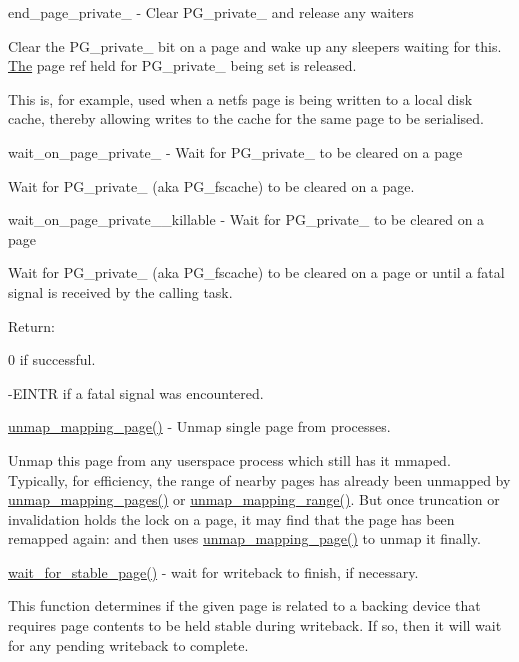 end\+\_\+page\+\_\+private\+\_ -\/ Clear P\+G\+\_\+private\+\_ and release any waiters

Clear the P\+G\+\_\+private\+\_ bit on a page and wake up any sleepers waiting for this. \mbox{\hyperlink{classThe}{The}} page ref held for P\+G\+\_\+private\+\_ being set is released.

This is, for example, used when a netfs page is being written to a local disk cache, thereby allowing writes to the cache for the same page to be serialised.

wait\+\_\+on\+\_\+page\+\_\+private\+\_ -\/ Wait for P\+G\+\_\+private\+\_ to be cleared on a page

Wait for P\+G\+\_\+private\+\_ (aka P\+G\+\_\+fscache) to be cleared on a page.

wait\+\_\+on\+\_\+page\+\_\+private\+\_\+\_\+killable -\/ Wait for P\+G\+\_\+private\+\_ to be cleared on a page

Wait for P\+G\+\_\+private\+\_ (aka P\+G\+\_\+fscache) to be cleared on a page or until a fatal signal is received by the calling task.

Return\+:
\begin{DoxyItemize}
\item 0 if successful.
\item -\/E\+I\+N\+TR if a fatal signal was encountered.
\end{DoxyItemize}

\mbox{\hyperlink{mm_2memory_8c_a4d439e775b6cc8d8d9b4850f51e6e563}{unmap\+\_\+mapping\+\_\+page()}} -\/ Unmap single page from processes.

Unmap this page from any userspace process which still has it mmaped. Typically, for efficiency, the range of nearby pages has already been unmapped by \mbox{\hyperlink{mm_2memory_8c_afb3cdfd244b83569cc07806d0f3420da}{unmap\+\_\+mapping\+\_\+pages()}} or \mbox{\hyperlink{mm_2memory_8c_acdab5131c868494117512298740bcc4b}{unmap\+\_\+mapping\+\_\+range()}}. But once truncation or invalidation holds the lock on a page, it may find that the page has been remapped again\+: and then uses \mbox{\hyperlink{mm_2memory_8c_a4d439e775b6cc8d8d9b4850f51e6e563}{unmap\+\_\+mapping\+\_\+page()}} to unmap it finally.

\mbox{\hyperlink{linux_2pagemap_8h_a6894dab407ad5c4678e36da2e2ea1c5c}{wait\+\_\+for\+\_\+stable\+\_\+page()}} -\/ wait for writeback to finish, if necessary.

This function determines if the given page is related to a backing device that requires page contents to be held stable during writeback. If so, then it will wait for any pending writeback to complete.

